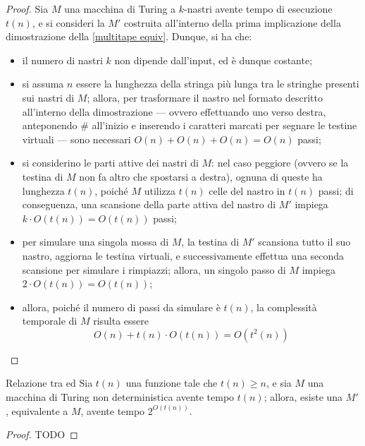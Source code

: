 \documentclass[a4paper, 12pt]{report}
\begin{document}
    \begin{proof}
        Sia $M$ una macchina di Turing a $k$-nastri avente tempo di esecuzione $t(n)$, e si consideri la \TM $M'$ costruita all'interno della prima implicazione della dimostrazione della \cref{multitape equiv}. Dunque, si ha che:

        \begin{itemize}
            \item il numero di nastri $k$ non dipende dall'input, ed è dunque costante;
            \item si assuma $n$ essere la lunghezza della stringa più lunga tra le stringhe presenti sui nastri di $M$; allora, per trasformare il nastro nel formato descritto all'interno della dimostrazione --- ovvero effettuando uno  verso destra, anteponendo \ttt \# all'inizio e inserendo i caratteri marcati per segnare le testine virtuali --- sono necessari $O(n) + O(n) + O(n) = O(n)$ passi;
            \item si considerino le parti attive dei nastri di $M$: nel caso peggiore (ovvero se la testina di $M$ non fa altro che spostarsi a destra), ognuna di queste ha lunghezza $t(n)$, poiché $M$ utilizza $t(n)$ celle del nastro in $t(n)$ passi; di conseguenza, una scansione della parte attiva del nastro di $M'$ impiega $k \cdot O(t(n))= O(t(n))$ passi;
            \item per simulare una singola mossa di $M$, la testina di $M'$ scansiona tutto il suo nastro, aggiorna le testina virtuali, e successivamente effettua una seconda scansione per simulare i rimpiazzi; allora, un singolo passo di $M$ impiega $2 \cdot O(t(n)) = O(t(n))$;
            \item allora, poiché il numero di passi da simulare è $t(n)$, la complessità temporale di $M$ risulta essere $$O(n) + t(n) \cdot O(t(n)) = O(t^2(n))$$
        \end{itemize}
    \end{proof}

    \begin{framedthm}[label={ntm time}]{Relazione tra \TM ed \NTM}
        Sia $t(n)$ una funzione tale che $t(n) \ge n$, e sia $M$ una macchina di Turing non deterministica avente tempo $t(n)$; allora, esiste una \TM $M'$, equivalente a $M$, avente tempo $2^{O(t(n))}$.
    \end{framedthm}

    \begin{proof}
        TODO
    \end{proof}
\end{document}
